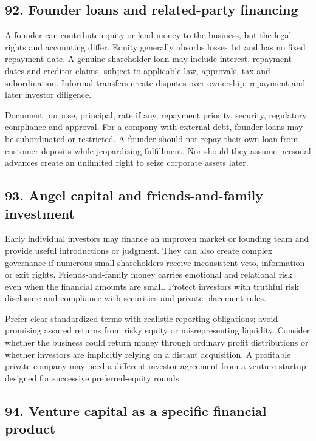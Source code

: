 \subsection{92. Founder loans and related-party financing}


A founder can contribute equity or lend money to the business, but the legal rights and accounting differ. Equity generally absorbs losses 1st and has no fixed repayment date. A genuine shareholder loan may include interest, repayment dates and creditor claims, subject to applicable law, approvals, tax and subordination. Informal transfers create disputes over ownership, repayment and later investor diligence.

Document purpose, principal, rate if any, repayment priority, security, regulatory compliance and approval. For a company with external debt, founder loans may be subordinated or restricted. A founder should not repay their own loan from customer deposits while jeopardizing fulfillment. Nor should they assume personal advances create an unlimited right to seize corporate assets later.

\subsection{93. Angel capital and friends-and-family investment}


Early individual investors may finance an unproven market or founding team and provide useful introductions or judgment. They can also create complex governance if numerous small shareholders receive inconsistent veto, information or exit rights. Friends-and-family money carries emotional and relational risk even when the financial amounts are small. Protect investors with truthful risk disclosure and compliance with securities and private-placement rules.

Prefer clear standardized terms with realistic reporting obligations; avoid promising assured returns from risky equity or misrepresenting liquidity. Consider whether the business could return money through ordinary profit distributions or whether investors are implicitly relying on a distant acquisition. A profitable private company may need a different investor agreement from a venture startup designed for successive preferred-equity rounds.

\subsection{94. Venture capital as a specific financial product}


